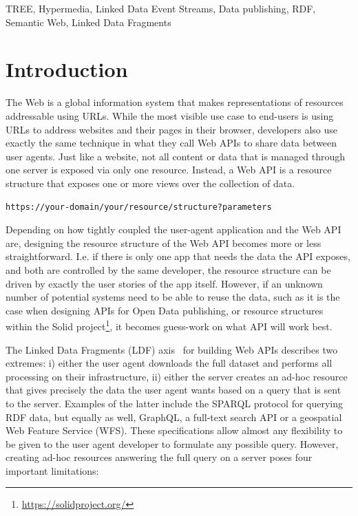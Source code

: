 \documentclass[
]{ceurart}
\begin{document}
\begin{keywords}
  TREE,
  Hypermedia,
  Linked Data Event Streams,
  Data publishing,
  RDF,
  Semantic Web,
  Linked Data Fragments
\end{keywords}

\maketitle

\section{Introduction}

The Web is a global information system that makes representations of resources addressable using URLs.
While the most visible use case to end-users is using URLs to address websites and their pages in their browser, developers also use exactly the same technique in what they call Web APIs to share data between user agents.
Just like a website, not all content or data that is managed through one server is exposed via only one resource.
Instead, a Web API is a resource structure that exposes one or more views over the collection of data.

\texttt{https://your-domain/your/resource/structure{?parameters}}

Depending on how tightly coupled the user-agent application and the Web API are, designing the resource structure of the Web API becomes more or less straightforward.
I.e. if there is only one app that needs the data the API exposes, and both are controlled by the same developer, the resource structure can be driven by exactly the user stories of the app itself.
However, if an unknown number of potential systems need to be able to reuse the data, such as it is the case when designing APIs for Open Data publishing, or resource structures within the Solid project\footnote{\url{https://solidproject.org/}}, it becomes guess-work on what API will work best.

The Linked Data Fragments (LDF) axis~\cite{verborgh_jws_2016} for building Web APIs describes two extremes: i) either the user agent downloads the full dataset and performs all processing on their infrastructure, ii) either the server creates an ad-hoc resource that gives precisely the data the user agent wants based on a query that is sent to the server.
Examples of the latter include the SPARQL protocol for querying RDF data, but equally as well, GraphQL, a full-text search API or a geospatial Web Feature Service (WFS).
These specifications allow almost any flexibility to be given to the user agent developer to formulate any possible query.
However, creating ad-hoc resources answering the full query on a server poses four important limitations:
\end{document}
